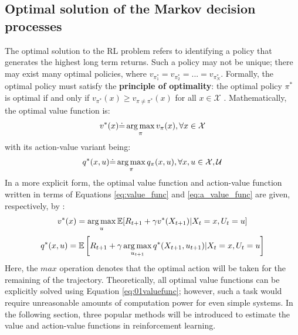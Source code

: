 \subsection{Optimal solution of the Markov decision processes}
The optimal solution to the RL problem refers to identifying a policy that generates the highest long term returns. Such a policy may not be unique; there may exist many optimal policies, where $v_{\pi^*_1} = v_{\pi^*_2} = ... = v_{\pi^*_N}$.  Formally, the optimal policy must satisfy the \textbf{principle of optimality}: the optimal policy $\pi^*$ is optimal if and only if $v_{\pi^*}(x) \geq v_{\pi \neq \pi^*}(x)$ for all $x \in \mathcal{X}$ \cite{PO}. Mathematically, the optimal value function is:
\begin{equation}
    v^*(x) \dot{=} \operatorname*{arg\,max}_{\pi} v_{\pi}(x), \forall x \in \mathcal{X}
\end{equation}
with its action-value variant being:
\begin{equation}
    q^*(x, u) \dot{=} \operatorname*{arg\,max}_{\pi} q_{\pi}(x, u), \forall x, u \in \mathcal{X, U}
\end{equation}
In a more explicit form, the optimal value function and action-value function written in terms of Equations \ref{eq:value_func} and \ref{eq:a_value_func} are given, respectively, by \cite{sutton}:
\begin{equation}
    v^*(x) = \operatorname*{arg\,max}_{u} \mathbb{E}[R_{t+1} + \gamma v^*(X_{t+1}) | X_t = x, U_t = u]
    \label{eq:01valuefunc}
\end{equation}
\begin{equation}
    q^*(x, u) = \mathbb{E}\left[R_{t+1} + \gamma \operatorname*{arg\,max}_{u_{t+1}} q^*(X_{t+1}, u_{t+1}) | X_t = x, U_t = u \right]
\end{equation}
Here, the $max$ operation denotes that the optimal action will be taken for the remaining of the trajectory. Theoretically, all optimal value functions can be explicitly solved using Equation \ref{eq:01valuefunc}; however, such a task would require unreasonable amounts of computation power for even simple systems. In the following section, three popular methods will be introduced to estimate the value and action-value functions in reinforcement learning.
